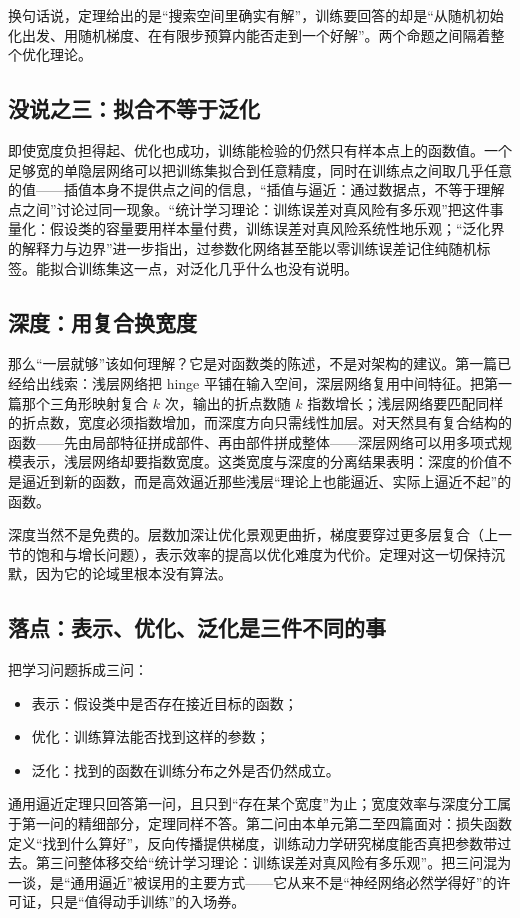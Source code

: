 换句话说，定理给出的是``搜索空间里确实有解''，训练要回答的却是``从随机初始化出发、用随机梯度、在有限步预算内能否走到一个好解''。两个命题之间隔着整个优化理论。

\subsection{没说之三：拟合不等于泛化}

即使宽度负担得起、优化也成功，训练能检验的仍然只有样本点上的函数值。一个足够宽的单隐层网络可以把训练集拟合到任意精度，同时在训练点之间取几乎任意的值——插值本身不提供点之间的信息，``插值与逼近：通过数据点，不等于理解点之间''讨论过同一现象。``统计学习理论：训练误差对真风险有多乐观''把这件事量化：假设类的容量要用样本量付费，训练误差对真风险系统性地乐观；``泛化界的解释力与边界''进一步指出，过参数化网络甚至能以零训练误差记住纯随机标签。能拟合训练集这一点，对泛化几乎什么也没有说明。

\subsection{深度：用复合换宽度}

那么``一层就够''该如何理解？它是对函数类的陈述，不是对架构的建议。第一篇已经给出线索：浅层网络把 hinge 平铺在输入空间，深层网络复用中间特征。把第一篇那个三角形映射复合 \(k\) 次，输出的折点数随 \(k\) 指数增长；浅层网络要匹配同样的折点数，宽度必须指数增加，而深度方向只需线性加层。对天然具有复合结构的函数——先由局部特征拼成部件、再由部件拼成整体——深层网络可以用多项式规模表示，浅层网络却要指数宽度。这类宽度与深度的分离结果表明：深度的价值不是逼近到新的函数，而是高效逼近那些浅层``理论上也能逼近、实际上逼近不起''的函数。

深度当然不是免费的。层数加深让优化景观更曲折，梯度要穿过更多层复合（上一节的饱和与增长问题），表示效率的提高以优化难度为代价。定理对这一切保持沉默，因为它的论域里根本没有算法。

\subsection{落点：表示、优化、泛化是三件不同的事}

把学习问题拆成三问：

\begin{itemize}
\tightlist
\item
  表示：假设类中是否存在接近目标的函数；
\item
  优化：训练算法能否找到这样的参数；
\item
  泛化：找到的函数在训练分布之外是否仍然成立。
\end{itemize}

通用逼近定理只回答第一问，且只到``存在某个宽度''为止；宽度效率与深度分工属于第一问的精细部分，定理同样不答。第二问由本单元第二至四篇面对：损失函数定义``找到什么算好''，反向传播提供梯度，训练动力学研究梯度能否真把参数带过去。第三问整体移交给``统计学习理论：训练误差对真风险有多乐观''。把三问混为一谈，是``通用逼近''被误用的主要方式——它从来不是``神经网络必然学得好''的许可证，只是``值得动手训练''的入场券。
